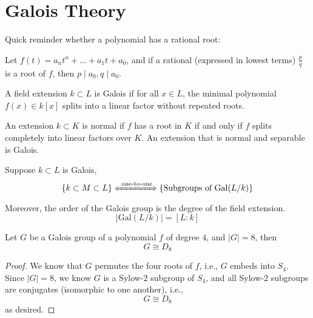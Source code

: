 \chapter{Galois Theory}



Quick reminder whether a polynomial has a rational root:
\begin{prop}
    Let $f(t)=a_nt^n+\dots+a_1t+a_0$, and if a rational (expressed in lowest terms) $\frac{p}{q}$ is a root of $f$, then $p\mid a_0, q\mid a_0$.
\end{prop}


\begin{defn}
    A field extension $k\subset L$ is Galois if for all $x\in L$, the minimal polynomial $f(x)\in k[x]$ splits into a linear factor without repeated roots.
\end{defn}
\begin{defn}
    An extension $k\subset K$ is normal if $f$ has a root in $K$ if and only if $f$ splits completely into linear factors over $K$. An extension that is normal and separable is Galois.
\end{defn}

\begin{thm}
    Suppose $k\subset L$ is Galois, 
    \begin{equation*}
        \left\{ k\subset M\subset L\right\} \xLeftrightarrow{\text{ one-to-one}} \left\{\text{Subgroups of Gal}(L/k) \right\}
    \end{equation*}
    Moreover, the order of the Galois group is the degree of the field extension.
    \begin{equation*}
        \left|\text{Gal}(L/k)\right|=[L:k]
    \end{equation*}
\end{thm}




\begin{prop}
    Let $G$ be a Galois group of a polynomial $f$ of degree $4$, and $|G|=8$, then 
    \begin{equation*}
        G\cong D_8
    \end{equation*}
\end{prop}
\begin{proof}
    We know that $G$ permutes the four roots of $f$, i.e., $G$ embeds into $S_4$. Since $|G|=8$, we know $G$ is a Sylow-$2$ subgroup of $S_4$, and all Sylow-$2$ subgroups are conjugates (isomorphic to one another), i.e., 
    \begin{equation*}
        G\cong D_8
    \end{equation*}
    as desired.
\end{proof}

